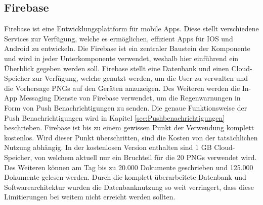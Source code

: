 \subsection{Firebase}\label{firebase}
Firebase ist eine Entwicklungsplattform für mobile Apps. 
Diese stellt verschiedene Services zur Verfügung, welche es ermöglichen, effizient Apps für IOS und Android zu entwickeln. 
Die Firebase ist ein zentraler Baustein der Komponente und wird in jeder Unterkomponente verwendet, weshalb hier einführend 
ein Überblick gegeben werden soll. 
Firebase stellt eine Datenbank und einen Cloud-Speicher zur Verfügung, welche genutzt werden, um die User zu verwalten und die 
Vorhersage PNGs auf den Geräten anzuzeigen.
Des Weiteren werden die In-App Messaging Dienste von Firebase verwendet, um die Regenwarnungen in Form von Push Benachrichtigungen zu senden. 
Die genaue Funktionsweise der Push Benachrichtigungen wird in Kapitel \ref{sec:Pushbenachrichtigungen} beschrieben.   
Firebase ist bis zu einem gewissen Punkt der Verwendung komplett kostenlos. 
Wird dieser Punkt überschritten, sind die Kosten von der tatsächlichen Nutzung abhängig. 
In der kostenlosen Version enthalten sind 1 GB Cloud-Speicher, von welchem aktuell nur ein Bruchteil für die 20 PNGs 
verwendet wird. Des Weiteren können am Tag bis zu 20.000 Dokumente geschrieben und 125.000 Dokumente gelesen werden. 
Durch die komplett überarbeitete Datenbank und Softwarearchitektur wurden die Datenbanknutzung so weit verringert, 
dass diese Limitierungen bei weitem nicht erreicht werden sollten.